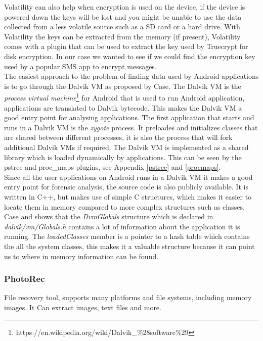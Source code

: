   Volatility can also help when encryption is used on the device, if the device is
  powered down the keys will be lost and you might be unable to use the data 
  collected from a less volatile source such as a SD card or a hard drive. With
  Volatility the keys can be extracted from the memory (if present), Volatility 
  comes with a plugin that can be used to extract the key used by Truecrypt for 
  disk encryption. In our case we wanted to see if we could find the encryption
  key used by a popular SMS app to encrypt messages.\\
  
  The easiest approach to the problem of finding data used by Android
  applications is to go through the Dalvik VM as proposed by Case\cite{case2011}.
  The Dalvik VM is the \textit{process virtual
  machine}\footnote{https://en.wikipedia.org/wiki/Dalvik\_\%28software\%29} for
  Android that is used to run Android application, applications are translated to
  Dalvik bytecode. This makes the Dalvik VM a good entry point for analysing
  applications. The first application that starts and runs in a Dalvik VM is the
  \textit{zygote} process. It preloades and initializes classes that are shared
  between different processes, it is also the process that will fork additional
  Dalvik VMs if required. The Dalvik VM is implemented as a shared library which
  is loaded dynamically by applications. This can be seen by the pstree and
  proc\_maps plugins, see Appendix \ref{pstree} and \ref{procmaps}. \\

  Since all the user applications on Android runs in a Dalvik VM it makes a good entry
  point for forensic analysis, the source code is also publicly available. It is
  written in C++, but makes use of simple C structures, which makes it easier to
  locate them in memory compared to more complex structures such as classes. Case
  and \cite{holger} shows that the \textit{DvmGlobals} structure which is
  declared in \textit{dalvik/vm/Globals.h} contains a lot of information about
  the application it is running. The \textit{loadedClasses} member is a pointer
  to a hash table which contains the all the system classes, this makes it a
  valuable structure because it can point us to where in memory information can
  be found. 

  \subsubsection{PhotoRec}
  File recovery tool, supports many platforms and file systems, including memory images. 
  It Can extract images, text files and more.
